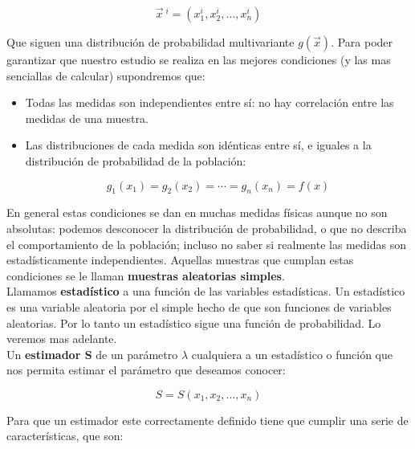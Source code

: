 \documentclass[12pt,a4paper]{book}
\begin{document}
$$ \vec{x} \ ^i = (x_1^i, x_2^i, \ldots,  x_n^i) $$

Que siguen una distribución de probabilidad multivariante $g(\vec{x})$. Para poder garantizar que nuestro estudio se realiza en las mejores condiciones (y las mas senciallas de calcular) supondremos que:

\begin{itemize}
\item Todas las medidas son independientes entre sí: no hay correlación entre las medidas de una muestra.

\item Las distribuciones de cada medida son idénticas entre sí, e iguales a la distribución de probabilidad de la población:

$$ g_1 (x_1) = g_2 (x_2) = \cdots = g_n(x_n) = f(x)$$
\end{itemize}

En general estas condiciones se dan en muchas medidas físicas aunque no son absolutas: podemos desconocer la distribución de probabilidad, o que no describa el comportamiento de la población; incluso no saber si realmente las medidas son estadísticamente independientes. Aquellas muestras que cumplan estas condiciones se le llaman \textbf{muestras aleatorias simples}. \\

Llamamos \textbf{estadístico} a una función de las variables estadísticas. Un estadístico es una variable aleatoria por el simple hecho de que son funciones de variables aleatorias. Por lo tanto un estadístico sigue una función de probabilidad. Lo veremos mas adelante. \\

Un \textbf{estimador S} de un parámetro $\lambda$ cualquiera a un estadístico o función que nos permita estimar el parámetro que deseamos conocer:

$$ S = S(x_1, x_2, \ldots, x_n) $$

Para que un estimador este correctamente definido tiene que cumplir una serie de características, que son:
\end{document}
